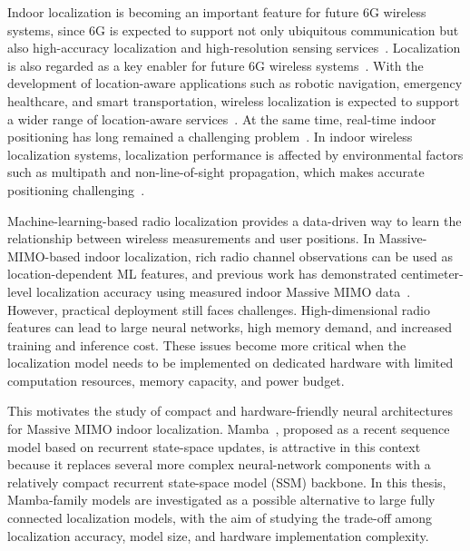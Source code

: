 \documentclass[11pt,twoside]{eitExjobb}
\makeatletter
\renewcommand\chapter{\clearpage\sh@chapter}
\makeatother
\begin{document}
\chapter{Introduction}
Indoor localization is becoming an important feature for future 6G wireless
systems, since 6G is expected to support not only ubiquitous communication but
also high-accuracy localization and high-resolution sensing
services~\cite{cite:Bourdoux2020}. Localization is also regarded as a key
enabler for future 6G wireless systems~\cite{cite:Trevlakis2023}. With the
development of location-aware applications such as robotic navigation,
emergency healthcare, and smart transportation, wireless localization is
expected to support a wider range of location-aware
services~\cite{cite:Tian2024}. At the same time, real-time indoor positioning
has long remained a challenging problem~\cite{cite:Mogyorosi2022}. In indoor
wireless localization systems, localization performance is affected by
environmental factors such as multipath and non-line-of-sight propagation,
which makes accurate positioning challenging~\cite{cite:Yaro2023}.

Machine-learning-based radio localization provides a data-driven way to learn
the relationship between wireless measurements and user positions. In
Massive-MIMO-based indoor localization, rich radio channel observations can be
used as location-dependent ML features, and previous work has demonstrated
centimeter-level localization accuracy using measured indoor Massive MIMO
data~\cite{cite:Tian2024,cite:TianICC2023}. However, practical deployment
still faces challenges. High-dimensional radio features can lead to
large neural networks, high memory demand, and increased training and inference
cost. These issues become more critical when the localization model needs to be
implemented on dedicated hardware with limited computation resources, memory
capacity, and power budget.

This motivates the study of compact and hardware-friendly neural architectures
for Massive MIMO indoor localization. Mamba~\cite{cite:Mamba2023}, proposed as
a recent sequence model based on recurrent state-space updates, is attractive
in this context because it replaces several more complex neural-network
components with a relatively compact recurrent state-space model (SSM)
backbone. In this thesis, Mamba-family models are investigated as a possible
alternative to large fully connected localization models, with the aim of
studying the trade-off among localization accuracy, model size, and hardware
implementation complexity.
\end{document}
